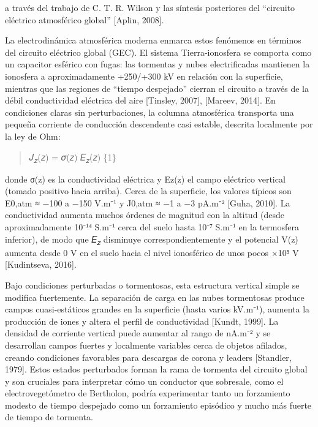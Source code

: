 \documentclass[
]{article}
\begin{document}
a través del trabajo de C. T. R. Wilson y las síntesis posteriores del
``circuito eléctrico atmosférico global'' {[}Aplin, 2008{]}.

La electrodinámica atmosférica moderna enmarca estos fenómenos en
términos del circuito eléctrico global (GEC). El sistema
Tierra-ionosfera se comporta como un capacitor esférico con fugas: las
tormentas y nubes electrificadas mantienen la ionosfera a
aproximadamente +250/+300 kV en relación con la superficie, mientras que
las regiones de ``tiempo despejado'' cierran el circuito a través de la
débil conductividad eléctrica del aire {[}Tinsley, 2007{]}, {[}Mareev,
2014{]}. En condiciones claras sin perturbaciones, la columna
atmosférica transporta una pequeña corriente de conducción descendente
casi estable, descrita localmente por la ley de Ohm:

\begin{quote}
𝐽\textsubscript{𝑧}(𝑧) = 𝜎(𝑧) 𝐸\textsubscript{𝑧}(𝑧) \{1\}
\end{quote}

donde σ(z) es la conductividad eléctrica y Ez(z) el campo eléctrico
vertical (tomado positivo hacia arriba). Cerca de la superficie, los
valores típicos son E0,atm ≈ −100 a −150 V.m⁻¹ y J0,atm ≈ −1 a −3 pA.m⁻²
{[}Guha, 2010{]}. La conductividad aumenta muchos órdenes de magnitud
con la altitud (desde aproximadamente 10⁻¹⁴ S.m⁻¹ cerca del suelo hasta
10⁻⁷ S.m⁻¹ en la termosfera inferior), de modo que
\textbar 𝐸\textsubscript{𝑧}\textbar{} disminuye correspondientemente y
el potencial V(z) aumenta desde 0 V en el suelo hacia el nivel
ionosférico de unos pocos ×10⁵ V {[}Kudintseva, 2016{]}.

Bajo condiciones perturbadas o tormentosas, esta estructura vertical
simple se modifica fuertemente. La separación de carga en las nubes
tormentosas produce campos cuasi-estáticos grandes en la superficie
(hasta varios kV.m⁻¹), aumenta la producción de iones y altera el perfil
de conductividad {[}Kundt, 1999{]}. La densidad de corriente vertical
puede aumentar al rango de nA.m⁻² y se desarrollan campos fuertes y
localmente variables cerca de objetos afilados, creando condiciones
favorables para descargas de corona y leaders {[}Standler, 1979{]}.
Estos estados perturbados forman la rama de tormenta del circuito global
y son cruciales para interpretar cómo un conductor que sobresale, como
el electrovegetómetro de Bertholon, podría experimentar tanto un
forzamiento modesto de tiempo despejado como un forzamiento episódico y
mucho más fuerte de tiempo de tormenta.
\end{document}
